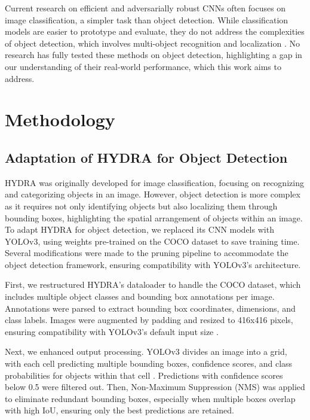 \documentclass[10pt]{cai}
\begin{document}
Current research on efficient and adversarially robust CNNs often focuses on image classification, a simpler task than object detection. While classification models are easier to prototype and evaluate, they do not address the complexities of object detection, which involves multi-object recognition and localization \cite{10099639}. No research has fully tested these methods on object detection, highlighting a gap in our understanding of their real-world performance, which this work aims to address.


\section{Methodology}
\subsection{Adaptation of HYDRA for Object Detection}
HYDRA was originally developed for image classification, focusing on recognizing and categorizing objects in an image. However, object detection is more complex as it requires not only identifying objects but also localizing them through bounding boxes, highlighting the spatial arrangement of objects within an image. To adapt HYDRA for object detection, we replaced its CNN models with YOLOv3, using weights pre-trained on the COCO dataset to save training time. Several modifications were made to the pruning pipeline to accommodate the object detection framework, ensuring compatibility with YOLOv3's architecture.

First, we restructured HYDRA's dataloader to handle the COCO dataset, which includes multiple object classes and bounding box annotations per image. Annotations were parsed to extract bounding box coordinates, dimensions, and class labels. Images were augmented by padding and resized to 416x416 pixels, ensuring compatibility with YOLOv3's default input size \cite{redmon2018yolov3incrementalimprovement}.

Next, we enhanced output processing. YOLOv3 divides an image into a grid, with each cell predicting multiple bounding boxes, confidence scores, and class probabilities for objects within that cell \cite{redmon2018yolov3incrementalimprovement}. Predictions with confidence scores below 0.5 were filtered out. Then, Non-Maximum Suppression (NMS) \cite{nms} was applied to eliminate redundant bounding boxes, especially when multiple boxes overlap with high IoU, ensuring only the best predictions are retained.
\end{document}
